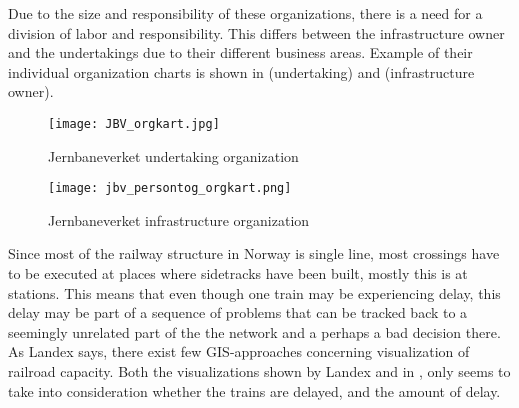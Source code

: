 Due to the size and responsibility of these organizations, there is a need for 
a division of labor and responsibility. This differs between the 
infrastructure owner and the undertakings due to their different business 
areas. Example of their individual organization charts is shown in  (undertaking) and  (infrastructure owner).

\begin{figure}[!htbp]
	\texttt{[image: JBV\_orgkart.jpg]}
	\caption[Jernbaneverket undertaking organization]{Jernbaneverket undertaking organization \cite{sintefPresis}}
	\label{fig:jbv_undertaking_org_map}
\end{figure}

\begin{figure}[!htbp]
	\texttt{[image: jbv\_persontog\_orgkart.png]}
	\caption[Jernbaneverket infrastructure organization]{Jernbaneverket infrastructure organization \cite{jernbaneverketOrganisasjon}}
	\label{fig:jbv_infrastructure_org_map}
\end{figure}

Since most of the railway structure in Norway is single line, most crossings
have to be executed at places where sidetracks have been built, mostly this is
at stations. This means that even though one train may be experiencing delay, 
this delay may be part of a sequence of problems that can be tracked back to a 
seemingly unrelated part of the the network and a perhaps a bad decision there\cite{cule2011mining}.
\\

As Landex\cite{landex2009gis} says, there exist few GIS-approaches concerning
visualization of railroad capacity. Both the visualizations shown by Landex and
in  , 
only seems to take into consideration whether
the trains are delayed, and the amount of delay. \\

